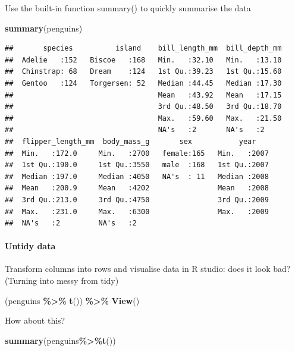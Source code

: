 \documentclass[
]{article}
\newenvironment{Shaded}{\begin{snugshade}}{\end{snugshade}}
\newcommand{\FunctionTok}[1]{\textcolor[rgb]{0.13,0.29,0.53}{\textbf{#1}}}
\newcommand{\NormalTok}[1]{#1}
\newcommand{\SpecialCharTok}[1]{\textcolor[rgb]{0.81,0.36,0.00}{\textbf{#1}}}
\begin{document}
Use the built-in function summary() to quickly summarise the data

\begin{Shaded}
\begin{Highlighting}[]
\FunctionTok{summary}\NormalTok{(penguins) }
\end{Highlighting}
\end{Shaded}

\begin{verbatim}
##       species          island    bill_length_mm  bill_depth_mm  
##  Adelie   :152   Biscoe   :168   Min.   :32.10   Min.   :13.10  
##  Chinstrap: 68   Dream    :124   1st Qu.:39.23   1st Qu.:15.60  
##  Gentoo   :124   Torgersen: 52   Median :44.45   Median :17.30  
##                                  Mean   :43.92   Mean   :17.15  
##                                  3rd Qu.:48.50   3rd Qu.:18.70  
##                                  Max.   :59.60   Max.   :21.50  
##                                  NA's   :2       NA's   :2      
##  flipper_length_mm  body_mass_g       sex           year     
##  Min.   :172.0     Min.   :2700   female:165   Min.   :2007  
##  1st Qu.:190.0     1st Qu.:3550   male  :168   1st Qu.:2007  
##  Median :197.0     Median :4050   NA's  : 11   Median :2008  
##  Mean   :200.9     Mean   :4202                Mean   :2008  
##  3rd Qu.:213.0     3rd Qu.:4750                3rd Qu.:2009  
##  Max.   :231.0     Max.   :6300                Max.   :2009  
##  NA's   :2         NA's   :2
\end{verbatim}

\hypertarget{untidy-data}{%
\paragraph{Untidy data}\label{untidy-data}}

Transform columns into rows and visualise data in R studio: does it look
bad? (Turning into messy from tidy)

\begin{Shaded}
\begin{Highlighting}[]
\NormalTok{(penguins }\SpecialCharTok{\%\textgreater{}\%} \FunctionTok{t}\NormalTok{()) }\SpecialCharTok{\%\textgreater{}\%} \FunctionTok{View}\NormalTok{()}
\end{Highlighting}
\end{Shaded}

How about this?

\begin{Shaded}
\begin{Highlighting}[]
\FunctionTok{summary}\NormalTok{(penguins}\SpecialCharTok{\%\textgreater{}\%}\FunctionTok{t}\NormalTok{())}
\end{Highlighting}
\end{Shaded}
\end{document}
